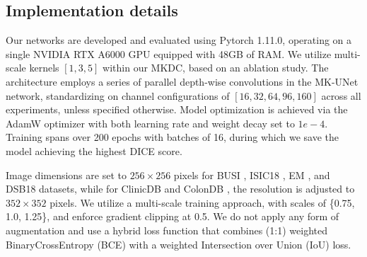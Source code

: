 \subsection{Implementation details}
\label{ssec:impl_details}

Our networks are developed and evaluated using Pytorch 1.11.0, operating on a single NVIDIA RTX A6000 GPU equipped with 48GB of RAM.  We utilize multi-scale kernels $[1,3,5]$ within our MKDC, based on an ablation study. The architecture employs a series of parallel depth-wise convolutions in the MK-UNet network, standardizing on channel configurations of $[16,32,64,96,160]$ across all experiments, unless specified otherwise. Model optimization is achieved via the AdamW \cite{loshchilov2017decoupled} optimizer with both learning rate and weight decay set to $1e-4$. Training spans over 200 epochs with batches of 16, during which we save the model achieving the highest DICE score. 

Image dimensions are set to $256\times256$ pixels for BUSI \cite{al2020dataset}, ISIC18 \cite{codella2018skin}, EM \cite{cardona2010integrated}, and DSB18 \cite{caicedo2019nucleus} datasets, while for ClinicDB \cite{bernal2015wm} and ColonDB \cite{vazquez2017benchmark}, the resolution is adjusted to $352\times352$ pixels. We utilize a multi-scale training approach, with scales of \{0.75, 1.0, 1.25\}, and enforce gradient clipping at 0.5. We do not apply any form of augmentation and use a hybrid loss function that combines (1:1) weighted BinaryCrossEntropy (BCE) with a weighted Intersection over Union (IoU) loss.

